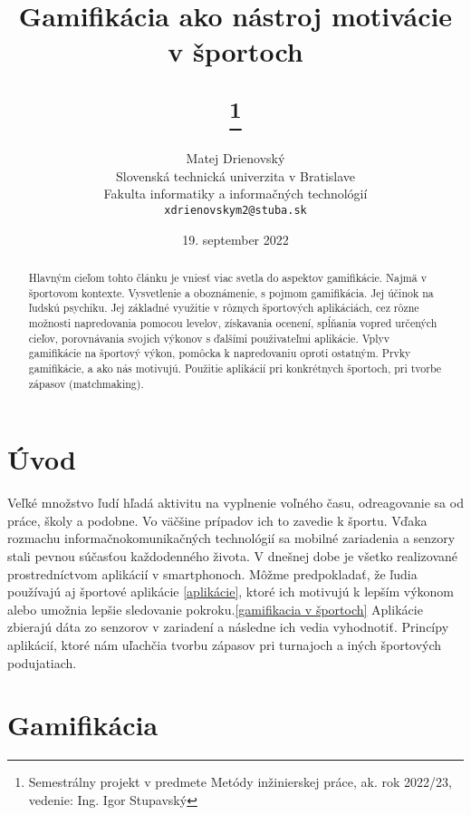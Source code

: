 \documentclass[10pt,twoside,slovak,a4paper]{article}
\title{Gamifikácia ako nástroj motivácie v športoch

\author{Matej Drienovský\\[2pt]
	{\small Slovenská technická univerzita v Bratislave}\\
	{\small Fakulta informatiky a informačných technológií}\\
	{\small \texttt{xdrienovskym2@stuba.sk}}
	}

\date{\small 19. september 2022}
\thanks{Semestrálny projekt v predmete Metódy inžinierskej práce, ak. rok 2022/23, vedenie: Ing. Igor Stupavský}}
\begin{document}
\maketitle

\begin{abstract}

Hlavným cieľom tohto článku je vniesť viac svetla do aspektov
gamifikácie. Najmä
v športovom kontexte. Vysvetlenie a oboznámenie, s pojmom gamifikácia. Jej účinok na
ľudskú psychiku. Jej základné využitie v rôznych športových aplikáciách, cez rôzne možnosti
napredovania pomocou levelov, získavania ocenení, spĺňania vopred určených cieľov,
porovnávania svojich výkonov s ďalšími použivateľmi aplikácie. Vplyv gamifikácie na športový
výkon, pomôcka k napredovaniu oproti ostatným. Prvky gamifikácie, a ako nás motivujú. Použitie aplikácií pri konkrétnych športoch, pri tvorbe zápasov
(matchmaking).
\end{abstract}


\section{Úvod}
Veľké množstvo ľudí hľadá aktivitu na vyplnenie voľného času, odreagovanie sa od práce, školy a podobne. Vo väčšine prípadov ich to zavedie k športu. 
Vďaka rozmachu informačnokomunikačných technológií sa mobilné zariadenia a senzory stali pevnou súčasťou každodenného života.
V dnešnej dobe je všetko realizované prostredníctvom aplikácií v smartphonoch. 
Môžme predpokladať, že ľudia používajú aj športové aplikácie \ref{aplikácie}, ktoré ich motivujú k lepším výkonom alebo umožnia lepšie sledovanie pokroku.\ref{gamifikacia v športoch} Aplikácie zbierajú dáta zo senzorov v zariadení a následne ich vedia vyhodnotiť.
Princípy aplikácií, ktoré nám uľachčia tvorbu zápasov pri turnajoch a iných športových podujatiach.\cite{Effect_of_gamification-Framework}


\newpage
\section{Gamifikácia} \label{gamifikácia}
\end{document}
